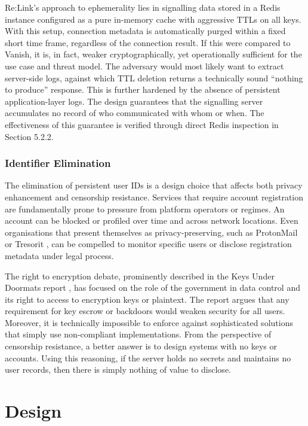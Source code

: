 \documentclass[12pt,a4paper]{article}
\begin{document}
Re:Link’s approach to ephemerality lies in signalling data stored in a Redis instance configured as a pure in-memory cache with aggressive TTLs on all keys. With this setup, connection metadata is automatically purged within a fixed short time frame, regardless of the connection result. If this were compared to Vanish, it is, in fact, weaker cryptographically, yet operationally sufficient for the use case and threat model. The adversary would most likely want to extract server-side logs, against which TTL deletion returns a technically sound “nothing to produce” response. This is further hardened by the absence of persistent application-layer logs. The design guarantees that the signalling server accumulates no record of who communicated with whom or when. The effectiveness of this guarantee is verified through direct Redis inspection in Section 5.2.2.

\subsubsection{Identifier Elimination}

The elimination of persistent user IDs is a design choice that affects both privacy enhancement and censorship resistance. Services that require account registration are fundamentally prone to pressure from platform operators or regimes. An account can be blocked or profiled over time and across network locations. Even organisations that present themselves as privacy-preserving, such as ProtonMail \cite{protonmail} or Tresorit \cite{tresorit}, can be compelled to monitor specific users or disclose registration metadata under legal process.

The right to encryption debate, prominently described in the Keys Under Doormats report \cite{abelson2015}, has focused on the role of the government in data control and its right to access to encryption keys or plaintext. The report argues that any requirement for key escrow or backdoors would weaken security for all users. Moreover, it is technically impossible to enforce against sophisticated solutions that simply use non-compliant implementations. From the perspective of censorship resistance, a better answer is to design systems with no keys or accounts. Using this reasoning, if the server holds no secrets and maintains no user records, then there is simply nothing of value to disclose.

\section{Design}
\end{document}
